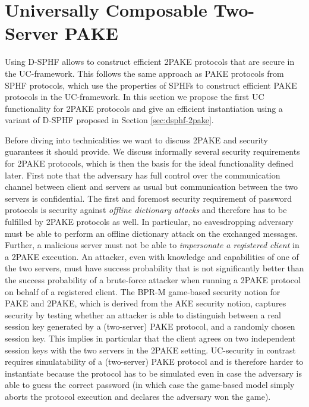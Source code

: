 \section{Universally Composable Two-Server PAKE} \label{sec:uc2pake}


Using \acl{D-SPHF} allows to construct efficient \ac{2PAKE} protocols that are secure in the \ac{UC}-framework.
This follows the same approach as \ac{PAKE} protocols from \ac{SPHF} protocols, which use the properties of \acp{SPHF} to construct efficient \ac{PAKE} protocols in the \ac{UC}-framework.
In this section we propose the first \ac{UC} functionality for \ac{2PAKE} protocols and give an efficient instantiation using a variant of \ac{D-SPHF} proposed in Section \ref{sec:dsphf-2pake}.

Before diving into technicalities we want to discuss \ac{2PAKE} and security guarantees it should provide.
We discuss informally several security requirements for \ac{2PAKE} protocols, which is then the basis for the ideal functionality \FTWOPAKE defined later.
First note that the adversary has full control over the communication channel between client and servers as usual but communication between the two servers is confidential.
The first and foremost security requirement of password protocols is security against \emph{offline dictionary attacks} and therefore has to be fulfilled by \ac{2PAKE} protocols as well.
In particular, no eavesdropping adversary must be able to perform an offline dictionary attack on the exchanged messages.
Further, a malicious server must not be able to \emph{impersonate a registered client} in a \ac{2PAKE} execution.
An attacker, even with knowledge and capabilities of one of the two servers, must have success probability that is not significantly better than the success probability of a brute-force attacker when running a \ac{2PAKE} protocol on behalf of a registered client.
The \ac{BPR-M} game-based security notion for \ac{PAKE} and \ac{2PAKE}, which is derived from the AKE security notion, captures security by testing whether an attacker is able to distinguish between a real session key generated by a (two-server) \ac{PAKE} protocol, and a randomly chosen session key.
This implies in particular that the client agrees on two independent session keys with the two servers in the \ac{2PAKE} setting.
\ac{UC}-security in contrast requires simulatability of a (two-server) \ac{PAKE} protocol and is therefore harder to instantiate because the protocol has to be simulated even in case the adversary is able to guess the correct password (in which case the game-based model simply aborts the protocol execution and declares the adversary won the game).

